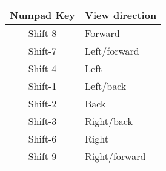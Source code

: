 \begin{tabular}{|c|l|}\hline
   Numpad Key  &  View direction\index{view directions}\\\hline
    Shift-8  & Forward\\
    Shift-7  & Left/forward\\
    Shift-4  & Left\\
    Shift-1  & Left/back\\
    Shift-2  & Back\\
    Shift-3  & Right/back\\
    Shift-6  & Right\\
    Shift-9  & Right/forward\\\hline
\end{tabular}

